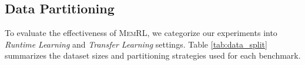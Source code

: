 \documentclass{article}
\theoremstyle{plain}
\theoremstyle{definition}
\theoremstyle{remark}
\begin{document}


\subsection{Data Partitioning}
To evaluate the effectiveness of \textsc{MemRL}, we categorize our experiments into \textit{Runtime Learning} and \textit{Transfer Learning} settings. Table \ref{tab:data_split} summarizes the dataset sizes and partitioning strategies used for each benchmark. 
\end{document}
